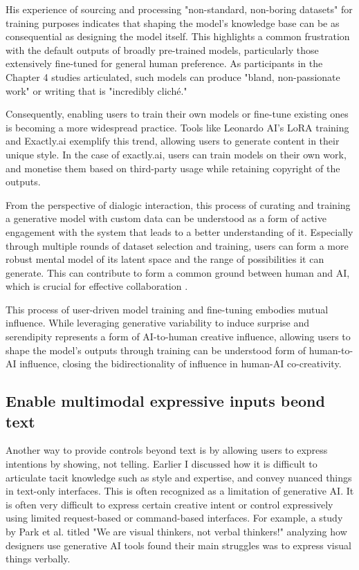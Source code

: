 His experience of sourcing and processing "non-standard, non-boring datasets" for training purposes indicates that shaping the model's knowledge base can be as consequential as designing the model itself. This highlights a common frustration with the default outputs of broadly pre-trained models, particularly those extensively fine-tuned for general human preference. As participants in the Chapter 4 studies articulated, such models can produce "bland, non-passionate work" or writing that is "incredibly cliché."

Consequently, enabling users to train their own models or fine-tune existing ones is becoming a more widespread practice. Tools like Leonardo AI's LoRA training and Exactly.ai exemplify this trend, allowing users to generate content in their unique style. In the case of exactly.ai, users can train models on their own work, and monetise them based on third-party usage while retaining copyright of the outputs. 

From the perspective of dialogic interaction, this process of curating and training a generative model with custom data can be understood as a form of active engagement with the system that leads to a better understanding of it. Especially through multiple rounds of dataset selection and training, users can form a more robust mental model of its latent space and the range of possibilities it can generate. This can contribute to form a common ground between human and AI, which is crucial for effective collaboration \cite{Dafoe2021-in}.

This process of user-driven model training and fine-tuning embodies mutual influence. While leveraging generative variability to induce surprise and serendipity represents a form of AI-to-human creative influence, allowing users to shape the model's outputs through training can be understood form of human-to-AI influence, closing the bidirectionality of influence in human-AI co-creativity.


\subsection{Enable multimodal expressive inputs beond text}

Another way to provide controls beyond text is by allowing users to express intentions by showing, not telling. Earlier I discussed how it is difficult to articulate tacit knowledge such as style and expertise, and convey nuanced things in text-only interfaces. This is often recognized as a limitation of generative AI. It is often very difficult to express certain creative intent or control expressively using limited request-based or command-based interfaces. For example, a study by Park et al. \cite{Park2024-gw} titled "We are visual thinkers, not verbal thinkers!" analyzing how designers use generative AI tools found their main struggles was to express visual things verbally.

